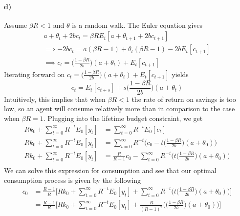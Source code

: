 \documentclass[11pt,letter]{article}
\begin{document}
\paragraph{d)} Assume $\beta R < 1$  and $\theta$ is a random walk. The Euler equation gives
\begin{equation*}
\begin{split}
	a + \theta_t + 2bc_t = \beta R E_t\left[a + \theta_{t+1} + 2b c_{t+1}\right]\\
	\implies -2bc_t = a(\beta R -1) + \theta_t(\beta R -1) - 2bE_t\left[c_{t+1}\right]\\
	\implies c_t = \bigg(\frac{1-\beta R}{2b}\bigg)(a + \theta_{t}) + E_t\left[c_{t+1}\right]
	\end{split}
\end{equation*}
Iterating forward on $ c_t = \bigg(\frac{1-\beta R}{2b}\bigg)(a+\theta_t) + E_t\left[c_{t+1}\right]$ yields 
\begin{equation*}
	c_t = E_t\left[c_{t+s}\right] + s\bigg(\frac{1-\beta R}{2b}\bigg)(a + \theta_{t})
\end{equation*}
Intuitively, this implies that when $\beta R < 1$ the rate of return on savings is too low, so an agent will consume relatively more than in comparison to the case when $\beta R =1$. Plugging into the lifetime budget constraint, we get
\begin{equation*}
\begin{split}
	Rk_0 + \sum_{t = 0}^{\infty}R^{-t}E_0\left[y_t\right] &= \sum_{t = 0}^{\infty}R^{-t}E_0\left[c_t\right]\\
	Rk_0  + \sum_{t = 0}^{\infty}R^{-t}E_0\left[y_t\right] &= \sum_{t = 0}^{\infty}R^{-t}\bigg(c_0 - t \bigg(\frac{1-\beta R}{2b}\bigg)(a + \theta_0)\bigg)\\
	Rk_0  + \sum_{t = 0}^{\infty}R^{-t}E_0\left[y_t\right] &= \frac{R}{R-1}c_0 - \sum_{t = 0}^{\infty}R^{-t}\bigg(t \bigg(\frac{1-\beta R}{2b}\bigg)(a + \theta_0)\bigg)\\
\end{split}
\end{equation*}
We can solve this expression for consumption and  see that our optimal consumption process is given by the following
\begin{equation}
\begin{split}
	c_0 &= \frac{R-1}{R} \bigg[Rk_0  + \sum_{t = 0}^{\infty}R^{-t}E_0\left[y_t\right] + \sum_{t = 0}^{\infty}R^{-t}\bigg(t \bigg(\frac{1-\beta R}{2b}\bigg)(a + \theta_0)\bigg)\bigg]\\&= \frac{R-1}{R} \bigg[Rk_0  + \sum_{t = 0}^{\infty}R^{-t}E_0\left[y_t\right] + \frac{R}{(R-1)^2}\bigg( \bigg(\frac{1-\beta R}{2b}\bigg)(a + \theta_0)\bigg)\bigg]
\end{split}
\end{equation}
\end{document}
